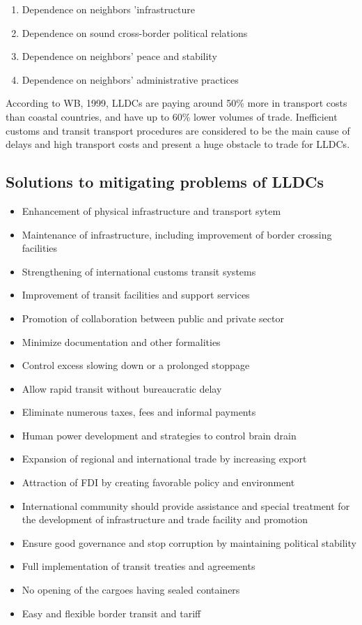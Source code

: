 \documentclass[
  openany]{book}
\providecommand{\tightlist}{%
  \setlength{\itemsep}{0pt}\setlength{\parskip}{0pt}}
\begin{document}
\begin{enumerate}
\def\labelenumi{\arabic{enumi}.}
\tightlist
\item
  Dependence on neighbors 'infrastructure
\item
  Dependence on sound cross-border political relations
\item
  Dependence on neighbors' peace and stability
\item
  Dependence on neighbors' administrative practices
\end{enumerate}

According to WB, 1999, LLDCs are paying around 50\% more in transport costs than coastal countries, and have up to 60\% lower volumes of trade. Inefficient customs and transit transport procedures are considered to be the main cause of delays and high transport costs and present a huge obstacle to trade for LLDCs.

\hypertarget{solutions-to-mitigating-problems-of-lldcs}{%
\subsection{Solutions to mitigating problems of LLDCs}\label{solutions-to-mitigating-problems-of-lldcs}}

\begin{itemize}
\tightlist
\item
  Enhancement of physical infrastructure and transport sytem
\item
  Maintenance of infrastructure, including improvement of border crossing facilities
\item
  Strengthening of international customs transit systems
\item
  Improvement of transit facilities and support services
\item
  Promotion of collaboration between public and private sector
\item
  Minimize documentation and other formalities
\item
  Control excess slowing down or a prolonged stoppage
\item
  Allow rapid transit without bureaucratic delay
\item
  Eliminate numerous taxes, fees and informal payments
\item
  Human power development and strategies to control brain drain
\item
  Expansion of regional and international trade by increasing export
\item
  Attraction of FDI by creating favorable policy and environment
\item
  International community should provide assistance and special treatment for the development of infrastructure and trade facility and promotion
\item
  Ensure good governance and stop corruption by maintaining political stability
\item
  Full implementation of transit treaties and agreements
\item
  No opening of the cargoes having sealed containers
\item
  Easy and flexible border transit and tariff
\end{itemize}
\end{document}
